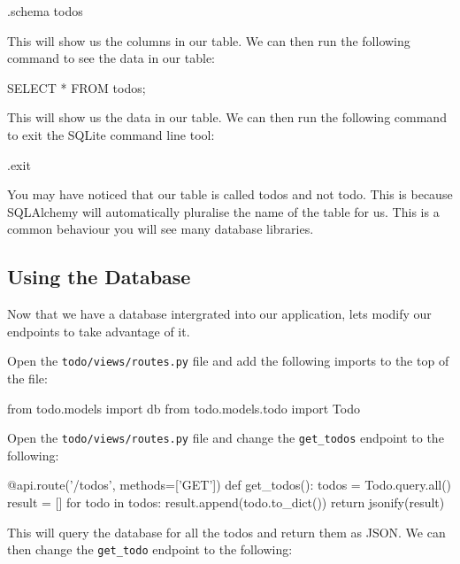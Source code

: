\documentclass{csse4400}
\begin{document}
\begin{code}[language=sql,numbers=none]{}
  .schema todos
\end{code}

This will show us the columns in our table. We can then run the following command to see the data in our table:

\begin{code}[language=sql,numbers=none]{}
  SELECT * FROM todos;
\end{code}

This will show us the data in our table. We can then run the following command to exit the SQLite command line tool:

\begin{code}[language=sql,numbers=none]{}
  .exit
\end{code}

You may have noticed that our table is called todos and not todo. This is because SQLAlchemy will automatically pluralise the name of the table for us. This is a common behaviour you will see many database libraries.


\subsection{Using the Database}

Now that we have a database intergrated into our application, lets modify our endpoints to take advantage of it. 

Open the \texttt{todo/views/routes.py} file and add the following imports to the top of the file:

\begin{code}[language=python,numbers=none]{}
  from todo.models import db
  from todo.models.todo import Todo
\end{code}

Open the \texttt{todo/views/routes.py} file and change the \texttt{get\_todos} endpoint to the following:

\begin{code}[language=python,numbers=none]{}
  @api.route('/todos', methods=['GET'])
  def get_todos():
      todos = Todo.query.all()
      result = []
      for todo in todos:
          result.append(todo.to_dict())
      return jsonify(result)
\end{code}

This will query the database for all the todos and return them as JSON. We can then change the \texttt{get\_todo} endpoint to the following:
\end{document}
